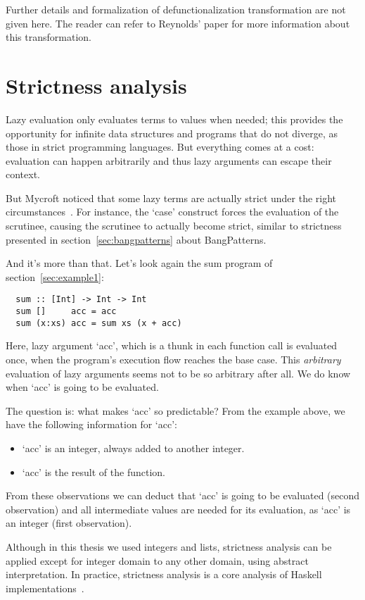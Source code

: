 \documentclass[diploma]{softlab-thesis}
\begin{document}
Further details and formalization of defunctionalization transformation are not given here. 
The reader can refer to Reynolds' paper for more information about this transformation.

\section {Strictness analysis}
\label{sec:strictness-analysis}

Lazy evaluation only evaluates terms to values when needed; this provides the 
opportunity for infinite data structures and programs that do not diverge, as those in 
strict programming languages. But everything comes at a cost: evaluation can happen 
arbitrarily and thus lazy arguments can escape their context.

But Mycroft
noticed that some lazy terms are actually strict under the right circumstances~\cite{Mycroft:1980:TPT:647324.721526}. For instance, the `case' 
construct forces the evaluation of the scrutinee, causing the scrutinee to actually become strict, 
similar to strictness presented in section~\ref{sec:bangpatterns} about BangPatterns. 

And it's more than that. Let's look again the sum program of section~\ref{sec:example1}:
\begin{verbatim}
  sum :: [Int] -> Int -> Int
  sum []     acc = acc
  sum (x:xs) acc = sum xs (x + acc)
\end{verbatim}

Here, lazy argument `acc', which is a thunk in each function call is evaluated once, when the program's 
execution flow reaches the base case. This \textit{arbitrary} evaluation of lazy arguments seems not to 
be so arbitrary after all. We do know when `acc' is going to be evaluated.

The question is: what makes `acc' so predictable? From the example above, we have the following information for `acc':
\begin{itemize}
  \item `acc' is an integer, always added to another integer.
  \item `acc' is the result of the function.
\end{itemize}

From these observations we can deduct that `acc' is going to be evaluated (second observation) and 
all intermediate values are needed for its evaluation, as `acc' is an integer (first observation).

Although in this thesis we used integers and lists, strictness
analysis can be applied except for integer domain to any other domain,
using abstract interpretation. In practice, strictness analysis is a
core analysis of Haskell
implementations~\cite{PeytonJones:1991:UVF:645420.652528,burn:lemetayer:1996,Holdermans:2010:MSM:2088270.2088274}.
\end{document}
